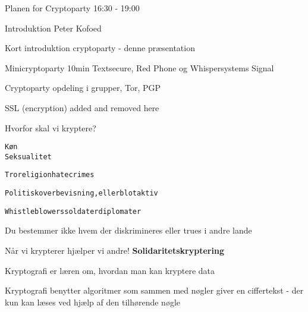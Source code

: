 \documentclass[20pt,landscape,a4paper,footrule]{foils}
\begin{document}



Planen for Cryptoparty 16:30 - 19:00
\begin{list2}
\item Introduktion Peter Kofoed
\item Kort introduktion cryptoparty - denne præsentation
\item Minicryptoparty 10min Textsecure, Red Phone og Whispersystems Signal
\item Cryptoparty opdeling i grupper, Tor, PGP
\end{list2}


\centerline{SSL (encryption) added and removed here}




Hvorfor skal vi kryptere?

\begin{alltt}
       Køn
                       Seksualitet

 Tro religion       hatecrimes

 Politisk overbevisning, eller blot aktiv

 Whistleblowers             soldater      diplomater

\end{alltt}

\centerline{Du bestemmer ikke hvem der diskrimineres eller trues i andre lande}

\vskip2cm

Når vi krypterer hjælper vi andre! {\bf Solidaritetskryptering}



\begin{list1}
\item Kryptografi er læren om, hvordan man kan kryptere data
\item Kryptografi benytter algoritmer som sammen med nøgler giver en
  ciffertekst - der kun kan læses ved hjælp af den tilhørende nøgle
\end{list1}
\end{document}
